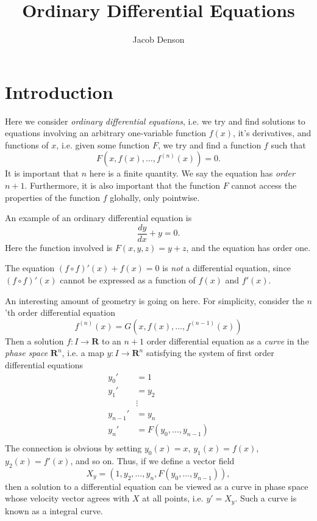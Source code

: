 

\title{Ordinary Differential Equations}
\author{Jacob Denson}




\maketitle

\tableofcontents


\chapter{Introduction}

Here we consider \emph{ordinary differential equations}, i.e. we try and find solutions to equations involving an arbitrary one-variable function $f(x)$, it's derivatives, and functions of $x$, i.e. given some function $F$, we try and find a function $f$ such that
%
\[ F(x,f(x), \dots, f^{(n)}(x)) = 0. \]
%
It is important that $n$ here is a finite quantity. We say the equation has \emph{order} $n+1$. Furthermore, it is also important that the function $F$ cannot access the properties of the function $f$ globally, only pointwise.

\begin{example}
    An example of an ordinary differential equation is
    \[ \frac{dy}{dx} + y = 0. \]
    Here the function involved is $F(x,y,z) = y + z$, and the equation has order one.
\end{example}

\begin{example}
    The equation $(f \circ f)'(x) + f(x) = 0$ is \emph{not} a differential equation, since $(f \circ f)'(x)$ cannot be expressed as a function of $f(x)$ and $f'(x)$.
\end{example}

An interesting amount of geometry is going on here. For simplicity, consider the $n$'th order differential equation
%
\[ f^{(n)}(x) = G(x,f(x), \dots, f^{(n-1)}(x)) \]
%
Then a solution $f: I \to \mathbf{R}$ to an $n+1$ order differential equation as a \emph{curve} in the \emph{phase space} $\mathbf{R}^n$, i.e. a map $y: I \to \mathbf{R}^n$ satisfying the system of first order differential equations
%
\begin{align*}
    y_0' &= 1\\
    y_1' &= y_2\\
        & \vdots\\
    y_{n-1}' &= y_n\\
    y_n' &= F(y_0, \dots, y_{n-1})\\
\end{align*}
%
The connection is obvious by setting $y_0(x) = x$, $y_1(x) = f(x)$, $y_2(x) = f'(x)$, and so on. Thus, if we define a vector field
%
\[ X_{y} = (1,y_2,\dots,y_n,F(y_0, \dots, y_{n-1})), \]
%
then a solution to a differential equation can be viewed as a curve in phase space whose velocity vector agrees with $X$ at all points, i.e. $y' = X_y$. Such a curve is known as a integral curve.

